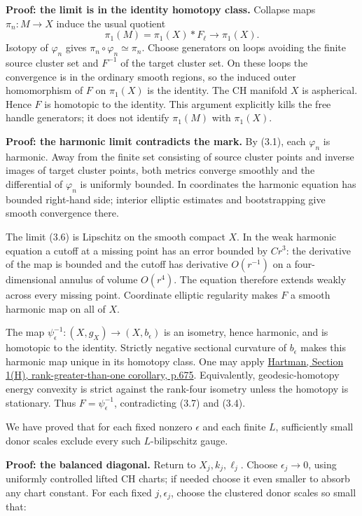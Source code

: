 \documentclass[
  10pt,
]{article}
\begin{document}
\textbf{Proof: the limit is in the identity homotopy class.} Collapse
maps \(\pi_n:M\to X\) induce the usual quotient \[
 \pi_1(M)=\pi_1(X)*F_\ell\longrightarrow\pi_1(X).
\] Isotopy of \(\varphi_n\) gives \(\pi_n\circ\varphi_n\simeq\pi_n\).
Choose generators on loops avoiding the finite source cluster set and
\(F^{-1}\) of the target cluster set. On these loops the convergence is
in the ordinary smooth regions, so the induced outer homomorphism of
\(F\) on \(\pi_1(X)\) is the identity. The CH manifold \(X\) is
aspherical. Hence \(F\) is homotopic to the identity. This argument
explicitly kills the free handle generators; it does not identify
\(\pi_1(M)\) with \(\pi_1(X)\).

\textbf{Proof: the harmonic limit contradicts the mark.} By (3.1), each
\(\varphi_n\) is harmonic. Away from the finite set consisting of source
cluster points and inverse images of target cluster points, both metrics
converge smoothly and the differential of \(\varphi_n\) is uniformly
bounded. In coordinates the harmonic equation has bounded right-hand
side; interior elliptic estimates and bootstrapping give smooth
convergence there.

The limit (3.6) is Lipschitz on the smooth compact \(X\). In the weak
harmonic equation a cutoff at a missing point has an error bounded by
\(C r^3\): the derivative of the map is bounded and the cutoff has
derivative \(O(r^{-1})\) on a four-dimensional annulus of volume
\(O(r^4)\). The equation therefore extends weakly across every missing
point. Coordinate elliptic regularity makes \(F\) a smooth harmonic map
on all of \(X\).

The map \(\psi_\epsilon^{-1}:(X,g_X)\to(X,b_\epsilon)\) is an isometry,
hence harmonic, and is homotopic to the identity. Strictly negative
sectional curvature of \(b_\epsilon\) makes this harmonic map unique in
its homotopy class. One may apply
\href{https://math.jhu.edu/~js/Math646/hartman.harmonic.pdf}{Hartman,
Section 1(H), rank-greater-than-one corollary, p.675}. Equivalently,
geodesic-homotopy energy convexity is strict against the rank-four
isometry unless the homotopy is stationary. Thus
\(F=\psi_\epsilon^{-1}\), contradicting (3.7) and (3.4).

We have proved that for each fixed nonzero \(\epsilon\) and each finite
\(L\), sufficiently small donor scales exclude every such
\(L\)-bilipschitz gauge.

\textbf{Proof: the balanced diagonal.} Return to \(X_j,k_j,\ell_j\).
Choose \(\epsilon_j\to0\), using uniformly controlled lifted CH charts;
if needed choose it even smaller to absorb any chart constant. For each
fixed \(j,\epsilon_j\), choose the clustered donor scales so small that:
\end{document}
